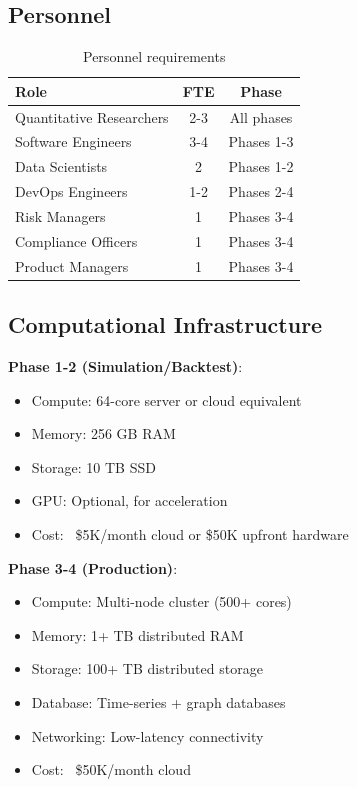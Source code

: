 \documentclass[12pt]{article}
\begin{document}
\subsection{Personnel}

\begin{table}[h]
\centering
\begin{tabular}{|l|c|c|}
\hline
Role & FTE & Phase \\
\hline
Quantitative Researchers & 2-3 & All phases \\
Software Engineers & 3-4 & Phases 1-3 \\
Data Scientists & 2 & Phases 1-2 \\
DevOps Engineers & 1-2 & Phases 2-4 \\
Risk Managers & 1 & Phases 3-4 \\
Compliance Officers & 1 & Phases 3-4 \\
Product Managers & 1 & Phases 3-4 \\
\hline
\end{tabular}
\caption{Personnel requirements}
\end{table}

\subsection{Computational Infrastructure}

\textbf{Phase 1-2 (Simulation/Backtest)}:
\begin{itemize}
    \item Compute: 64-core server or cloud equivalent
    \item Memory: 256 GB RAM
    \item Storage: 10 TB SSD
    \item GPU: Optional, for acceleration
    \item Cost: ~\$5K/month cloud or \$50K upfront hardware
\end{itemize}

\textbf{Phase 3-4 (Production)}:
\begin{itemize}
    \item Compute: Multi-node cluster (500+ cores)
    \item Memory: 1+ TB distributed RAM
    \item Storage: 100+ TB distributed storage
    \item Database: Time-series + graph databases
    \item Networking: Low-latency connectivity
    \item Cost: ~\$50K/month cloud
\end{itemize}
\end{document}
